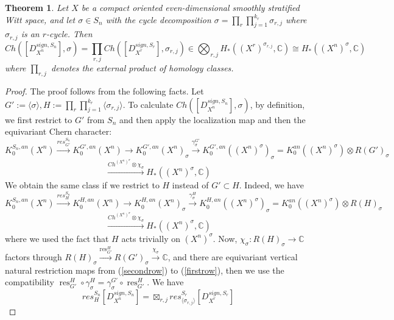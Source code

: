 \documentclass[11pt,leqno,twoside]{amsart}
\theoremstyle{plainsl}
\newtheorem{theorem}{Theorem}[section]
\theoremstyle{definition}
\begin{document}
\begin{theorem}\label{symmetricfactorchern}
Let $X$ be a compact oriented even-dimensional
smoothly stratified Witt space, and let
$\sigma\in S_n$ with the cycle decomposition $\sigma=\prod_r\prod^{k_r}_{j=1}\sigma_{r,j}$ where  $\sigma_{r,j}$ is an $r$-cycle. Then
    \[Ch(\left[D^{sign,S_n}_{X^n}\right],\sigma)=\prod_{r,j}  Ch([D^{sign,S_r}_{X^r}],\sigma_{r,j}) \in  \bigotimes_{r,j} H_*((X^{r})^{\sigma_{r,j}},\mathbb{C})\cong H_*((X^n)^{\sigma},\mathbb{C})\]
  where  $\prod_{r,j}$ denotes the external
product of homology classes.
 \end{theorem}
\begin{proof}
The proof follows from the following facts. Let $G':=\langle \sigma\rangle ,H:=\prod_r \prod^{k_r}_{j=1} \langle  \sigma_{r,j}\rangle$. To calculate $Ch(\left[D^{sign,S_n}_{X^n}\right],\sigma)$, by definition, we first restrict to $G'$ from $S_n$ and then apply the localization map and then the equivariant Chern character:
  \begin{equation}\label{firstrow}
     K_0^{S_n,an}(X^n)\xrightarrow{res^{S_n}_{G'}} K_0^{G',an}(X^n)\rightarrow K_0^{G',an}(X^n)_{{\sigma}}\xrightarrow[]{\gamma^{G'}_{\sigma}}K_0^{G',an}((X^n)^\sigma)_{\sigma}=K^{an}_0((X^n)^\sigma) \otimes R(G')_{\sigma}
  \end{equation}
  \[ \xrightarrow{Ch^{(X^n)^{\sigma}}\otimes \chi_\sigma}H_*((X^n)^\sigma,\mathbb{C}) \]
    We obtain the same class if we restrict to $H$ instead of $G'\subset H$. Indeed, we have
    \begin{equation}\label{secondrow}
        K_0^{S_n,an}(X^n)\xrightarrow{res^{S_n}_{H}} K_0^{H,an}(X^n)\rightarrow K_0^{H,an}(X^n)_{{\sigma}}\xrightarrow[]{\gamma^{H}_{\sigma}}K_0^{H,an}((X^n)^\sigma)_{\sigma}=K^{an}_0((X^n)^\sigma) \otimes R(H)_{\sigma}
    \end{equation}
\[\xrightarrow{Ch^{(X^n)^{\sigma}}\otimes \chi_\sigma}H_*((X^n)^\sigma,\mathbb{C})\]
where we used the fact that $H$ acts trivially on $(X^n)^{\sigma}$. Now, $\chi_\sigma:R(H)_{\sigma} \rightarrow \mathbb{C}$ factors through $R(H)_{\sigma}\xrightarrow{\operatorname{res}^{H}_{G'}} R(G')_{\sigma}\xrightarrow{\chi_\sigma}\mathbb{C}$, and there are equivariant vertical natural restriction maps from   (\ref{secondrow}) to (\ref{firstrow}), then we use the compatibility  $
\operatorname{res}^{H}_{G'}
\circ\gamma_\sigma^H
=
\gamma_\sigma^{G'}
\circ\operatorname{res}^{H}_{G'}
$.
We  have 
\[res^{S_n}_H \left[D^{sign,S_n}_{X^n}\right]=\boxtimes_{r,j} res_{\langle  \sigma_{r,j}\rangle}^{S_r} [D^{sign,S_r}_{X^r}]\]

\end{proof}
\end{document}
